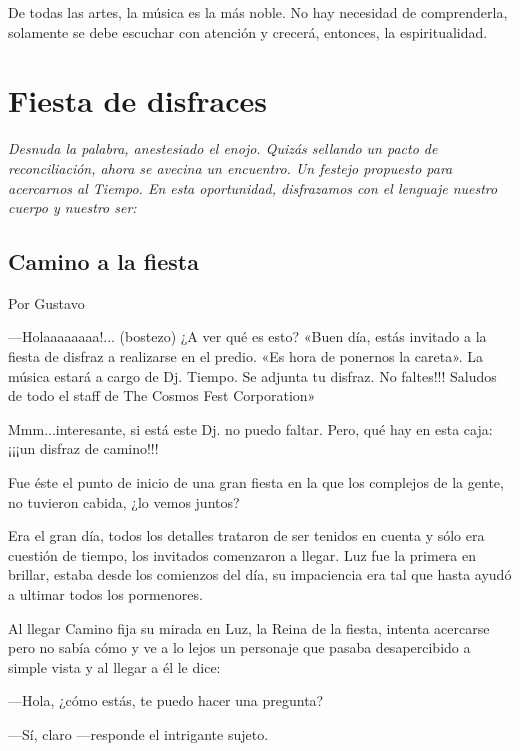 \documentclass[11pt,twoside,openright,a5paper]{book}
\begin{document}
De todas las artes, la música es la más noble. No hay necesidad de comprenderla, solamente se debe escuchar con atención y crecerá, entonces, la espiritualidad.

\chapter*{Fiesta de disfraces}

\vspace{0.5cm}
\emph{Desnuda la palabra, anestesiado el enojo. Quizás sellando un pacto de reconciliación, ahora se avecina un encuentro. Un festejo propuesto para acercarnos al Tiempo. En esta oportunidad, disfrazamos con el lenguaje nuestro cuerpo y nuestro ser:}

\section*{Camino a la fiesta}

\begin{flushright}Por Gustavo\end{flushright}

---Holaaaaaaaa!... (bostezo) ¿A ver qué es esto?  «Buen día, estás invitado a la fiesta de disfraz a realizarse en el predio. «Es hora de ponernos la careta». La música estará a cargo de Dj. Tiempo. Se adjunta tu disfraz. No faltes!!!  Saludos de todo el staff de The Cosmos Fest Corporation»

Mmm...interesante, si está este Dj. no puedo faltar. Pero, qué hay en esta caja: ¡¡¡un disfraz de camino!!! 

Fue éste el punto de inicio de una gran fiesta en la que los complejos de la gente, no tuvieron cabida, ¿lo vemos juntos?

Era el gran día, todos los detalles trataron de ser tenidos en cuenta y sólo era cuestión de tiempo, los invitados comenzaron a llegar. Luz fue la primera en brillar, estaba desde los comienzos del día, su impaciencia era tal que hasta ayudó a ultimar todos los pormenores.

Al llegar Camino fija su mirada en Luz, la Reina de la fiesta, intenta acercarse pero no sabía cómo y ve a lo lejos un personaje que pasaba desapercibido a simple vista y al llegar a él le dice: 

---Hola, ¿cómo estás, te puedo hacer una pregunta?

---Sí, claro ---responde el intrigante sujeto. 
\end{document}
